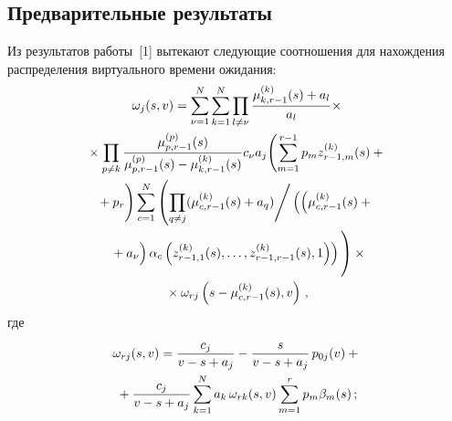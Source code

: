 \begin{multicols}{2}
\section{Предварительные результаты}

Из результатов работы~[1] вытекают следующие соотношения для нахождения распределения 
виртуального времени ожидания:
\begin{multline}
\label{3}
\omega_{j}(s,v)=
\sum\limits_{\nu=1}^N\sum\limits_{k=1}^N
\prod\limits_{l\ne \nu}\fr{\mu_{k,r-1}^{(k)}(s)+a_l}{a_l}\times\\
{}\times
\prod\limits_{p\ne k}\fr{\mu_{p,r-1}^{(p)}(s)}{\mu_{p,r-1}^{(p)}(s)-\mu_{k,r-1}^{(k)}(s)}
c_{\nu}a_j\!\left(\sum\limits_{m=1}^{r-1} p_mz_{r-1,m}^{(k)}(s)+{}\right.\\
\left.{}+ p_r
\vphantom{\sum\limits_{m=1}^{r-1}}
\right)
\sum\limits_{c=1}^N
\left(\prod\limits_{q\ne j}(\mu_{c,r-1}^{(k)}(s)+a_q)\Bigg /
\left(\left(\mu_{c,r-1}^{(k)}(s)+{}\right.\right.\right.\\
\left.\left.\left.{}+a_{\nu}\vphantom{\mu_{c,r-1}^{(k)}}\right)
\alpha_c\left(z_{r-1,1}^{(k)}(s),\ldots,z_{r-1,r-1}^{(k)}(s),1\right) \right)
\vphantom{\prod\limits_{q\ne j} \sum\limits_{c=1}^N}
\right)\times{}\\
{}\times 
\omega_{rj}\left(s-\mu_{c,r-1}^{(k)}(s),v\right)\,,
\end{multline}
где
\begin{multline}
\omega_{rj}(s,v)=\displaystyle\frac{\displaystyle c_j\mathstrut}{\displaystyle v-s+a_j\mathstrut}-\displaystyle\frac{\displaystyle s\mathstrut}{\displaystyle v-s+a_j\mathstrut}\, p_{0j}(v)+{}\\
{}+\displaystyle\frac{\displaystyle c_j\mathstrut}{\displaystyle v-s+a_j\mathstrut}
\sum\limits_{k=1}^N a_k\,\omega_{rk}(s,v)\sum\limits_{m=1}^rp_m\beta_m(s)\,;
\label{4}
\end{multline}

\vspace*{-12pt}


\end{multicols}
